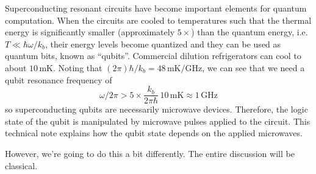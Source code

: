 
Superconducting resonant circuits have become important elements for quantum computation.
When the circuits are cooled to temperatures such that the thermal energy is significantly smaller (approximately $5\times$) than the quantum energy, i.e. $T \ll \hbar \omega / k_b$, their energy levels become quantized and they can be used as quantum bits, known as ``qubits''.
Commercial dilution refrigerators can cool to about $10\,\text{mK}$.
Noting that $(2\pi) \hbar / k_b = 48\,\text{mK} / \text{GHz}$, we can see that we need a qubit resonance frequency of
\begin{equation}
  \omega / 2 \pi > 5 \times \frac{k_b}{2\pi \hbar} \, 10\,\text{mK} \approx 1 \, \text{GHz}
\end{equation}
so superconducting qubits are necessarily microwave devices.
Therefore, the logic state of the qubit is manipulated by microwave pulses applied to the circuit.
This technical note explains how the qubit state depends on the applied microwaves.

However, we're going to do this a bit differently.
The entire discussion will be classical.
